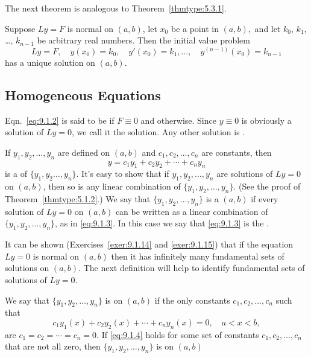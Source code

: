 \documentclass{ximera}
\begin{document}
The next theorem is analogous to
Theorem~\ref{thmtype:5.3.1}.

\begin{theorem}\label{thmtype:9.1.1}
Suppose   $Ly=F$ is normal on $(a,b)$, let $x_0$ be a point in
$(a,b),$
and let $k_0$, $k_1$, \dots, $k_{n-1}$ be arbitrary real numbers. Then
the initial value problem
$$
Ly=F, \quad  y(x_0)=k_0,\quad y'(x_0)=k_1,\dots,\quad y^{(n-1)}(x_0)=k_{n-1}
$$
has a unique solution on $(a,b)$.
\end{theorem}

\subsection*{Homogeneous Equations}

Eqn.~\eqref{eq:9.1.2} is said to be  if $F\equiv0$ and  otherwise. Since $y\equiv0$ is obviously a
solution of $Ly=0$, we call it the  solution. Any other
solution is .



If $y_1, y_2, \dots, y_n$ are defined on $(a,b)$ and
$c_1, c_2, \dots, c_n$ are constants, then
\begin{equation}\label{eq:9.1.3}
y=c_1y_1+c_2y_2+\cdots+c_ny_n
\end{equation}
is a  of $\{y_1,y_2\dots,y_n\}$. It's
easy
 to show that if $y_1, y_2, \dots, y_n$ are solutions of
$Ly=0$ on $(a,b)$, then so is any linear combination of
$\{y_1,y_2,\dots,y_n\}$. (See the proof of Theorem~\ref{thmtype:5.1.2}.) We
say that $\{y_1,y_2,\dots,y_n\}$ is a  $(a,b)$ if every solution of $Ly=0$ on
$(a,b)$ can be written as a linear combination of
$\{y_1,y_2,\dots,y_n\}$, as in \eqref{eq:9.1.3}. In this case we say that
\eqref{eq:9.1.3} is the .


It can be shown (Exercises~\ref{exer:9.1.14} and \ref{exer:9.1.15}) that if
the equation $Ly=0$ is normal on $(a,b)$ then it has
infinitely many fundamental  sets of solutions  on $(a,b)$.
The next definition will help to identify fundamental sets of
solutions of $Ly=0$.

We say that $\{y_1,y_2,\dots,y_n\}$ is  on
$(a,b)$ if the only constants $c_1, c_2, \dots, c_n$ such that
\begin{equation}\label{eq:9.1.4}
c_1y_1(x)+c_2y_2(x)+\cdots+c_ny_n(x)=0,\quad a<x<b,
\end{equation}
are $c_1=c_2=\cdots=c_n=0$. If \eqref{eq:9.1.4} holds for some set of
constants $c_1, c_2, \dots, c_n$ that are not all zero, then
$\{y_1,y_2,\dots,y_n\}$ is  on $(a,b)$
\end{document}
